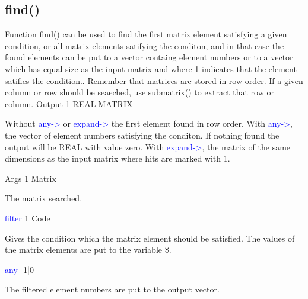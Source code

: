 \subsection{\textcolor{VioletRed}{find}()}
\label{find}
Function \textcolor{VioletRed}{find}() can be used to find the first matrix element satisfying a given condition, or
all matrix elements satifying the conditon, and in that case the found
elements can be put to a vector containg element numbers or to a
vector which has equal size as the input matrix and where 1 indicates that
the element satifies the condition..
Remember that matrices are stored in row order. If a given column or row should be seaeched,
use submatrix() to extract that row or column.
\vspace{0.3cm}
\hline
\vspace{0.3cm}
\noindent Output \tabto{3cm}  1 \tabto{5cm}   REAL|MATRIX \tabto{7cm}
\begin{changemargin}{3cm}{0cm}
\noindent Without \textcolor{blue}{any->} or \textcolor{blue}{expand->} the first element found in row order.
With \textcolor{blue}{any->}, the vector of element numbers satisfying the conditon. If nothing found
the output will be REAL with value zero.
With \textcolor{blue}{expand->}, the matrix of the same dimensions as the input matrix where
hits are marked with 1.
\end{changemargin}
\vspace{0.3cm}
\hline
\vspace{0.3cm}
\noindent Args \tabto{3cm} 1 \tabto{5cm}  Matrix \tabto{7cm}
\begin{changemargin}{3cm}{0cm}
\noindent  The matrix searched.
\end{changemargin}
\vspace{0.3cm}
\hline
\vspace{0.3cm}
\noindent \textcolor{blue}{filter} \tabto{3cm} 1 \tabto{5cm}  Code \tabto{7cm}
\begin{changemargin}{3cm}{0cm}
\noindent Gives the condition which the matrix element should be satisfied. The
values of the matrix elements are put to the variable \$.
\end{changemargin}
\vspace{0.3cm}
\hline
\vspace{0.3cm}
\noindent \textcolor{blue}{any} \tabto{3cm} -1|0 \tabto{5cm}    \tabto{7cm}
\begin{changemargin}{3cm}{0cm}
\noindent  The filtered element numbers are put to the output vector.
\end{changemargin}
